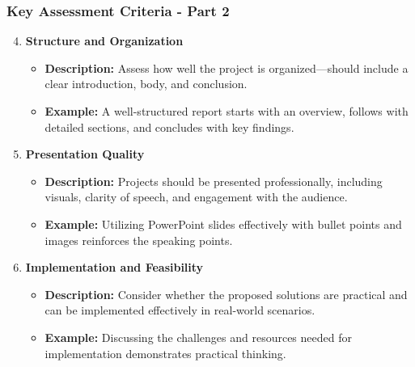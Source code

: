 \documentclass[aspectratio=169]{beamer}
\begin{document}
\begin{frame}[fragile]
    \frametitle{Key Assessment Criteria - Part 2}
    \begin{enumerate}
        \setcounter{enumi}{3}
        \item \textbf{Structure and Organization}
        \begin{itemize}
            \item \textbf{Description:} Assess how well the project is organized—should include a clear introduction, body, and conclusion.
            \item \textbf{Example:} A well-structured report starts with an overview, follows with detailed sections, and concludes with key findings.
        \end{itemize}

        \item \textbf{Presentation Quality}
        \begin{itemize}
            \item \textbf{Description:} Projects should be presented professionally, including visuals, clarity of speech, and engagement with the audience.
            \item \textbf{Example:} Utilizing PowerPoint slides effectively with bullet points and images reinforces the speaking points.
        \end{itemize}

        \item \textbf{Implementation and Feasibility}
        \begin{itemize}
            \item \textbf{Description:} Consider whether the proposed solutions are practical and can be implemented effectively in real-world scenarios.
            \item \textbf{Example:} Discussing the challenges and resources needed for implementation demonstrates practical thinking.
        \end{itemize}
    \end{enumerate}
\end{frame}
\end{document}
